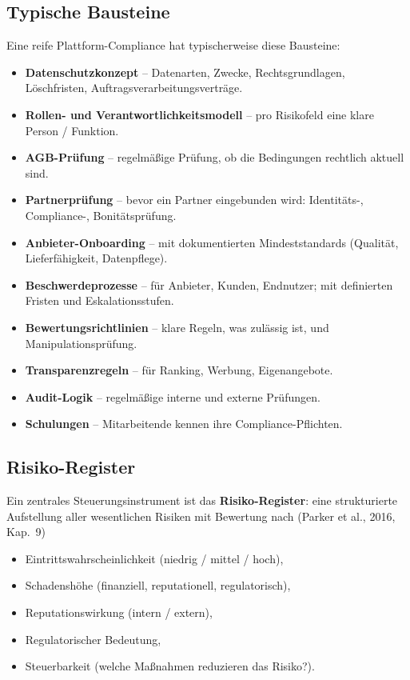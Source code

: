 \documentclass[11pt,a4paper,oneside]{article}
\newcommand{\fachbegriff}[1]{\textbf{#1}}
\newcommand{\quelle}[1]{{\footnotesize\color{lpGray}(#1)}}
\begin{document}
\subsection{Typische Bausteine}

Eine reife Plattform-Compliance hat typischerweise diese Bausteine:

\begin{itemize}
  \item \textbf{Datenschutzkonzept} -- Datenarten, Zwecke, Rechtsgrundlagen, Löschfristen, Auftragsverarbeitungsverträge.
  \item \textbf{Rollen- und Verantwortlichkeitsmodell} -- pro Risikofeld eine klare Person / Funktion.
  \item \textbf{AGB-Prüfung} -- regelmäßige Prüfung, ob die Bedingungen rechtlich aktuell sind.
  \item \textbf{Partnerprüfung} -- bevor ein Partner eingebunden wird: Identitäts-, Compliance-, Bonitätsprüfung.
  \item \textbf{Anbieter-Onboarding} -- mit dokumentierten Mindeststandards (Qualität, Lieferfähigkeit, Datenpflege).
  \item \textbf{Beschwerdeprozesse} -- für Anbieter, Kunden, Endnutzer; mit definierten Fristen und Eskalationsstufen.
  \item \textbf{Bewertungsrichtlinien} -- klare Regeln, was zulässig ist, und Manipulationsprüfung.
  \item \textbf{Transparenzregeln} -- für Ranking, Werbung, Eigenangebote.
  \item \textbf{Audit-Logik} -- regelmäßige interne und externe Prüfungen.
  \item \textbf{Schulungen} -- Mitarbeitende kennen ihre Compliance-Pflichten.
\end{itemize}

\subsection{Risiko-Register}

Ein zentrales Steuerungsinstrument ist das \fachbegriff{Risiko-Register}: eine strukturierte Aufstellung aller wesentlichen Risiken mit Bewertung nach \quelle{Parker et al., 2016, Kap.~9}

\begin{itemize}
  \item Eintrittswahrscheinlichkeit (niedrig / mittel / hoch),
  \item Schadenshöhe (finanziell, reputationell, regulatorisch),
  \item Reputationswirkung (intern / extern),
  \item Regulatorischer Bedeutung,
  \item Steuerbarkeit (welche Maßnahmen reduzieren das Risiko?).
\end{itemize}
\end{document}

